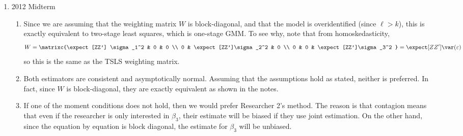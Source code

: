 \documentclass[10pt]{article}
\begin{document}
\begin{enumerate}
	\item 2012 Midterm \begin{enumerate} \item Since we are assuming that the weighting matrix $W$ is block-diagonal, and that the model is overidentified (since $\ell > k$), this is exactly equivalent to two-stage least squares, which is one-stage GMM. To see why, note that from homoskedasticity,\[W = \matrixc{\expect[ZZ'] \sigma_1^2 & 0 & 0 \\ 0 & \expect[ZZ']\sigma_2^2 & 0 \\ 0 & 0 & \expect[ZZ']\sigma_3^2 } = \expect[ZZ'] \var(\varepsilon)\]so this is the same as the TSLS weighting matrix. \item Both estimators are consistent and asymptotically normal. Assuming that the assumptions hold as stated, neither is preferred. In fact, since $\hat{W}$ is block-diagonal, they are exactly equivalent as shown in the notes. \item If one of the moment conditions does not hold, then we would prefer Researcher 2's method. The reason is that contagion means that even if the researcher is only interested in $\beta_3$, their estimate will be biased if they use joint estimation. On the other hand, since the equation by equation is block diagonal, the estimate for $\beta_3$ will be unbiased. \end{enumerate}

\end{enumerate}
\end{document}

